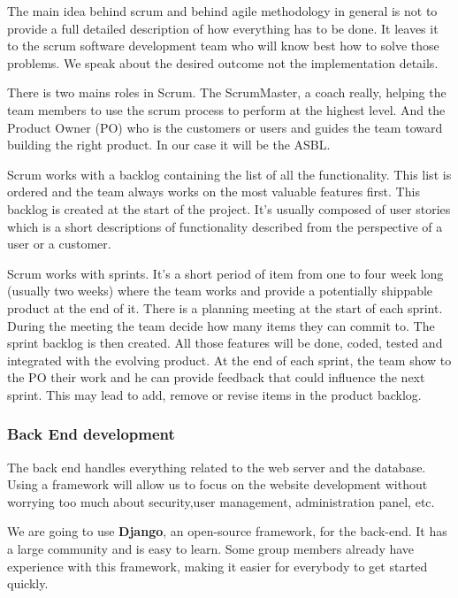 The main idea behind scrum and behind agile methodology in general is not to provide a full detailed description of how everything has to be done. It leaves it to the scrum software development team who will know best how to solve those problems. We speak about the desired outcome not the implementation details.\newline

There is two mains roles in Scrum. The ScrumMaster, a coach really, helping the team members to use the scrum process to perform at the highest level. And the Product Owner (PO) who is the customers or users and guides the team toward building the right product. In our case it will be the ASBL.\newline

Scrum works with a backlog containing the list of all the functionality. This list is ordered and the team always works on the most valuable features first. This backlog is created at the start of the project. It's usually composed of user stories which is a short descriptions of functionality described from the perspective of a user or a customer.\newline

Scrum works with sprints. It's a short period of item from one to four week long (usually two weeks) where the team works and provide a potentially shippable product at the end of it. There is a planning meeting at the start of each sprint. During the meeting the team decide how many items they can commit to. The sprint backlog is then created. All those features will be done, coded, tested and integrated with the evolving product. At the end of each sprint, the team show to the PO their work and he can provide feedback that could influence the next sprint. This may lead to add, remove or revise items in the product backlog.\newline

\iffalse
\subsubsection{Back End development}
The back end handles everything related to the web server and the database. Using a framework will allow us to focus on the website development without worrying too much about security,user management, administration panel, etc.\newline

We are going to use \textbf{Django}, an open-source framework, for the back-end. It has a large community and is easy to learn. Some group members already have experience with this framework, making it easier for everybody to get started quickly.\newline


